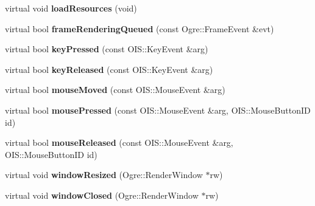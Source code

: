 \begin{DoxyCompactItemize}
\item 
\mbox{\label{class_base_application_aaeb764e637dd87601a81a80156659d88}} 
virtual void {\bfseries load\+Resources} (void)
\item 
\mbox{\label{class_base_application_a03912a0f38b38fede7f08a2571e8fc56}} 
virtual bool {\bfseries frame\+Rendering\+Queued} (const Ogre\+::\+Frame\+Event \&evt)
\item 
\mbox{\label{class_base_application_acfa977f04e435f18018ece805c1277ec}} 
virtual bool {\bfseries key\+Pressed} (const O\+I\+S\+::\+Key\+Event \&arg)
\item 
\mbox{\label{class_base_application_aba5c7c9dea7a0efc58b89310bae547e5}} 
virtual bool {\bfseries key\+Released} (const O\+I\+S\+::\+Key\+Event \&arg)
\item 
\mbox{\label{class_base_application_a126e59cb246b061e51eb6ce06a2ee8f4}} 
virtual bool {\bfseries mouse\+Moved} (const O\+I\+S\+::\+Mouse\+Event \&arg)
\item 
\mbox{\label{class_base_application_a9255dfc1eabefd11c474ec45a6622504}} 
virtual bool {\bfseries mouse\+Pressed} (const O\+I\+S\+::\+Mouse\+Event \&arg, O\+I\+S\+::\+Mouse\+Button\+ID id)
\item 
\mbox{\label{class_base_application_aa102c5859c14c0690c749994a446b53d}} 
virtual bool {\bfseries mouse\+Released} (const O\+I\+S\+::\+Mouse\+Event \&arg, O\+I\+S\+::\+Mouse\+Button\+ID id)
\item 
\mbox{\label{class_base_application_afacf8a797588592ef0abbad593f10cfa}} 
virtual void {\bfseries window\+Resized} (Ogre\+::\+Render\+Window $\ast$rw)
\item 
\mbox{\label{class_base_application_ae0e37ac54a31ff6e51d58c7654ad1b90}} 
virtual void {\bfseries window\+Closed} (Ogre\+::\+Render\+Window $\ast$rw)
\end{DoxyCompactItemize}
